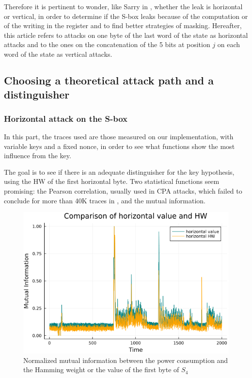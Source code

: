 \documentclass[11pt,technote]{IEEEtran}
\begin{document}
	Therefore it is pertinent to wonder, like Sarry in \cite{these}, whether the leak is horizontal or vertical, in order to determine if the S-box leaks because of the computation or of the writing in the register and to find better strategies of masking. Hereafter, this article refers to attacks on one byte of the last word of the state as horizontal attacks and to the ones on the concatenation of the 5 bits at position $j$ on each word of the state as vertical attacks.
	
	\subsection{Choosing a theoretical attack path and a distinguisher} \label{choice}
	\subsubsection{Horizontal attack on the S-box}
	In this part, the traces used are those measured on our implementation, with variable keys and a fixed nonce, in order to see what functions show the most influence from the key.
	
	The goal is to see if there is an adequate distinguisher for the key hypothesis, using the HW of the first horizontal byte. Two statistical functions seem promising: the Pearson correlation, usually used in CPA attacks, which failed to conclude for more than 40K traces in \cite{dl_cpa}, and the mutual information.
	
	\begin{figure}[h]
		\centering
		\includegraphics[scale=0.4]{img_files/horizontal_one_byte}
		\caption{Normalized mutual information between the power consumption and the Hamming weight or the value of the first byte of $S_4$}
		\label{hHW&val}
	\end{figure}
	
\end{document}
